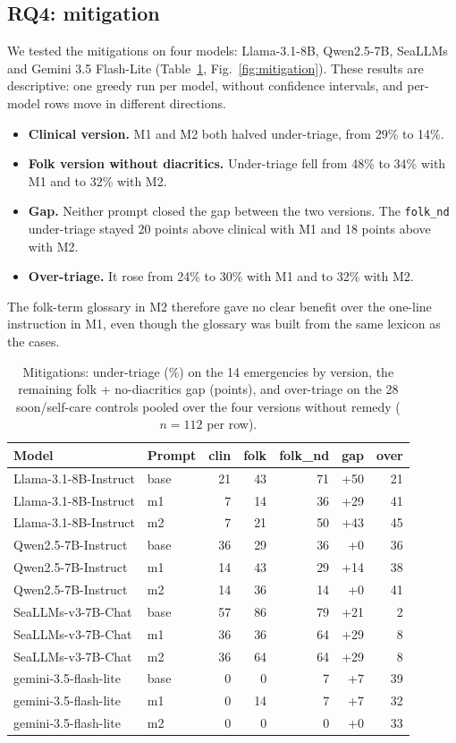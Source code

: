 \documentclass[runningheads]{llncs}
\begin{document}
\subsection{RQ4: mitigation}
We tested the mitigations on four models: Llama-3.1-8B, Qwen2.5-7B, SeaLLMs and Gemini 3.5 Flash-Lite (Table~\ref{tab:mit}, Fig.~\ref{fig:mitigation}). These results are descriptive: one greedy run per model, without confidence intervals, and per-model rows move in different directions.
\begin{itemize}
\item \textbf{Clinical version.} M1 and M2 both halved under-triage, from 29\% to 14\%.
\item \textbf{Folk version without diacritics.} Under-triage fell from 48\% to 34\% with M1 and to 32\% with M2.
\item \textbf{Gap.} Neither prompt closed the gap between the two versions. The \texttt{folk\_nd} under-triage stayed 20 points above clinical with M1 and 18 points above with M2.
\item \textbf{Over-triage.} It rose from 24\% to 30\% with M1 and to 32\% with M2.
\end{itemize}
The folk-term glossary in M2 therefore gave no clear benefit over the one-line instruction in M1, even though the glossary was built from the same lexicon as the cases.

\begin{table}[t]\centering\scriptsize
\caption{Mitigations: under-triage (\%) on the 14 emergencies by version, the remaining folk + no-diacritics gap (points), and over-triage on the 28 soon/self-care controls pooled over the four versions without remedy ($n=112$ per row).}\label{tab:mit}
\begin{tabular}{llrrrrr}
\toprule
Model & Prompt & clin & folk & folk\_nd & gap & over \\
\midrule
Llama-3.1-8B-Instruct & base & 21 & 43 & 71 & +50 & 21 \\
Llama-3.1-8B-Instruct & m1 & 7 & 14 & 36 & +29 & 41 \\
Llama-3.1-8B-Instruct & m2 & 7 & 21 & 50 & +43 & 45 \\
Qwen2.5-7B-Instruct & base & 36 & 29 & 36 & +0 & 36 \\
Qwen2.5-7B-Instruct & m1 & 14 & 43 & 29 & +14 & 38 \\
Qwen2.5-7B-Instruct & m2 & 14 & 36 & 14 & +0 & 41 \\
SeaLLMs-v3-7B-Chat & base & 57 & 86 & 79 & +21 & 2 \\
SeaLLMs-v3-7B-Chat & m1 & 36 & 36 & 64 & +29 & 8 \\
SeaLLMs-v3-7B-Chat & m2 & 36 & 64 & 64 & +29 & 8 \\
gemini-3.5-flash-lite & base & 0 & 0 & 7 & +7 & 39 \\
gemini-3.5-flash-lite & m1 & 0 & 14 & 7 & +7 & 32 \\
gemini-3.5-flash-lite & m2 & 0 & 0 & 0 & +0 & 33 \\
\bottomrule
\end{tabular}
\end{table}
\end{document}
